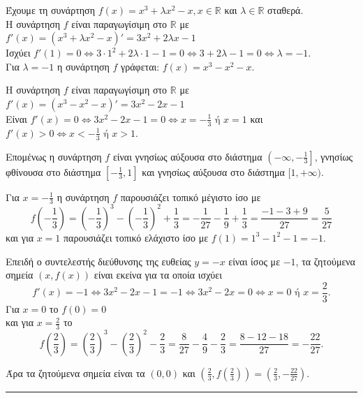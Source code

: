 \begin{alist}
\item Έχουμε τη συνάρτηση $f(x) = x^3 + \lambda x^2 - x, x \in \mathbb{R}$ και $\lambda \in \mathbb{R}$ σταθερά. \\
Η συνάρτηση $f$ είναι παραγωγίσιμη στο $\mathbb{R}$ με $f'(x) = (x^3 + \lambda x^2 - x)' = 3x^2 + 2\lambda x - 1$ \\
Ισχύει $f'(1) = 0 \Leftrightarrow 3 \cdot 1^2 + 2\lambda \cdot 1 - 1 = 0 \Leftrightarrow 3 + 2\lambda - 1 = 0 \Leftrightarrow \lambda = -1$. \\
Για $\lambda = -1$ η συνάρτηση $f$ γράφεται: $f(x) = x^3 - x^2 - x$.

\item Η συνάρτηση $f$ είναι παραγωγίσιμη στο $\mathbb{R}$ με $f'(x) = (x^3 - x^2 - x)' = 3x^2 - 2x - 1$ \\
Είναι $f'(x) = 0 \Leftrightarrow 3x^2 - 2x - 1 = 0 \Leftrightarrow x = -\frac{1}{3} \text{ ή } x = 1$ και $f'(x) > 0 \Leftrightarrow x < -\frac{1}{3} \text{ ή } x > 1$.

\begin{center}
\end{center}

Επομένως η συνάρτηση $f$ είναι γνησίως αύξουσα στο διάστημα $\left(-\infty, -\frac{1}{3}\right]$, γνησίως φθίνουσα στο διάστημα $\left[-\frac{1}{3}, 1\right]$ και γνησίως αύξουσα στο διάστημα $[1, +\infty)$.

Για $x = -\frac{1}{3}$ η συνάρτηση $f$ παρουσιάζει τοπικό μέγιστο ίσο με
\[ f\left(-\frac{1}{3}\right) = \left(-\frac{1}{3}\right)^3 - \left(-\frac{1}{3}\right)^2 + \frac{1}{3} = -\frac{1}{27} - \frac{1}{9} + \frac{1}{3} = \frac{-1-3+9}{27} = \frac{5}{27} \]
και για $x = 1$
παρουσιάζει τοπικό ελάχιστο ίσο με $f(1) = 1^3 - 1^2 - 1 = -1$.

\item Επειδή ο συντελεστής διεύθυνσης της ευθείας $y = -x$ είναι ίσος με $-1$, τα ζητούμενα σημεία $(x, f(x))$ είναι εκείνα για τα οποία ισχύει
\[ f'(x) = -1 \Leftrightarrow 3x^2 - 2x - 1 = -1 \Leftrightarrow 3x^2 - 2x = 0 \Leftrightarrow x = 0 \text{ ή } x = \frac{2}{3}. \]
Για $x = 0$ το $f(0) = 0$ \\
και για $x = \frac{2}{3}$ το 
\[ f\left(\frac{2}{3}\right) = \left(\frac{2}{3}\right)^3 - \left(\frac{2}{3}\right)^2 - \frac{2}{3} = \frac{8}{27} - \frac{4}{9} - \frac{2}{3} = \frac{8-12-18}{27} = -\frac{22}{27}. \]

Άρα τα ζητούμενα σημεία είναι τα $(0,0)$ και $\left(\frac{2}{3}, f\left(\frac{2}{3}\right)\right) = \left(\frac{2}{3}, -\frac{22}{27}\right)$.
\end{alist}
\vspace{6mm}
\noindent\rule{\textwidth}{0.4pt}
\vspace{6mm}

